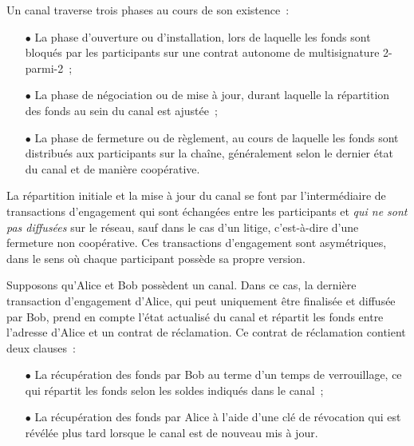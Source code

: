 Un canal traverse trois phases au cours de son existence~:

\begin{itemize}
\item[$\bullet$] La phase d'ouverture ou d'installation, lors de laquelle les fonds sont bloqués par les participants sur une contrat autonome de multisignature 2-parmi-2~;
\item[$\bullet$] La phase de négociation ou de mise à jour, durant laquelle la répartition des fonds au sein du canal est ajustée~;
\item[$\bullet$] La phase de fermeture ou de règlement, au cours de laquelle les fonds sont distribués aux participants sur la chaîne, généralement selon le dernier état du canal et de manière coopérative.
\end{itemize}

%
%
%

La répartition initiale et la mise à jour du canal se font par l'intermédiaire de transactions d'engagement qui sont échangées entre les participants et \emph{qui ne sont pas diffusées} sur le réseau, sauf dans le cas d'un litige, c'est-à-dire d'une fermeture non coopérative. Ces transactions d'engagement sont asymétriques, dans le sens où chaque participant possède sa propre version.

Supposons qu'Alice et Bob possèdent un canal. Dans ce cas, la dernière transaction d'engagement d'Alice, qui peut uniquement être finalisée et diffusée par Bob, prend en compte l'état actualisé du canal et répartit les fonds entre l'adresse d'Alice et un contrat de réclamation. Ce contrat de réclamation contient deux clauses~:

\begin{itemize}
\item[$\bullet$] La récupération des fonds par Bob au terme d'un temps de verrouillage, ce qui répartit les fonds selon les soldes indiqués dans le canal~;
\item[$\bullet$] La récupération des fonds par Alice à l'aide d'une clé de révocation qui est révélée plus tard lorsque le canal est de nouveau mis à jour.
\end{itemize}

